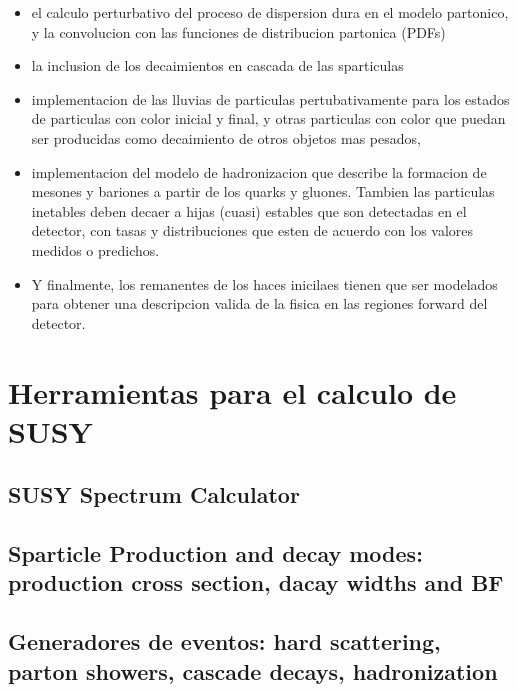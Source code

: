 \begin{itemize}\itemsep0.2cm\parskip0.2cm
\item el calculo perturbativo del proceso de dispersion dura en el
  modelo partonico, y la convolucion con las funciones de distribucion
  partonica (PDFs)
\item la inclusion de los decaimientos en cascada de las sparticulas
\item implementacion de las lluvias de particulas pertubativamente
  para los estados de particulas con color inicial y final, y otras
  particulas con color que puedan ser producidas como decaimiento
  de otros objetos mas pesados,
\item implementacion del modelo de hadronizacion que describe la
  formacion de mesones y bariones a partir de los quarks y gluones.
  Tambien las particulas inetables deben decaer a hijas (cuasi)
  estables que son detectadas en el detector, con tasas y distribuciones
  que esten de acuerdo con los valores medidos o predichos.
\item Y finalmente, los remanentes de los haces inicilaes tienen que
  ser modelados para obtener una descripcion valida de la fisica
  en las regiones forward del detector.
\end{itemize}









\section{Herramientas para el calculo de SUSY}

\subsection{SUSY Spectrum Calculator}
\subsection{Sparticle Production and decay modes: production cross section, dacay widths and BF}
\subsection{Generadores de eventos: hard scattering, parton showers, cascade decays, hadronization}





















